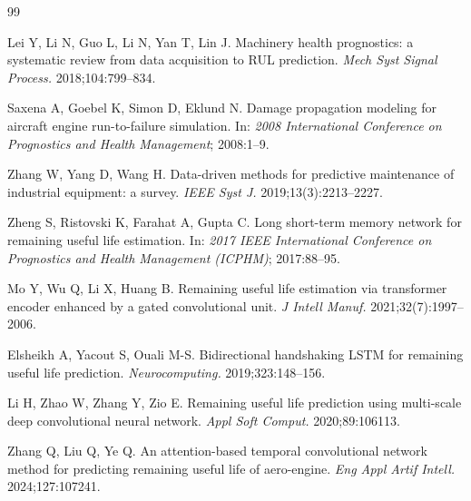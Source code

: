 \documentclass[AMA,Times1COL]{WileyNJDv5}
\begin{document}


%
%

\begin{thebibliography}{99}

Lei Y, Li N, Guo L, Li N, Yan T, Lin J.
Machinery health prognostics: a systematic review from data acquisition
to RUL prediction.
\textit{Mech Syst Signal Process.} 2018;104:799--834.

Saxena A, Goebel K, Simon D, Eklund N.
Damage propagation modeling for aircraft engine run-to-failure simulation.
In: \textit{2008 International Conference on Prognostics and Health
Management}; 2008:1--9.

Zhang W, Yang D, Wang H.
Data-driven methods for predictive maintenance of industrial equipment:
a survey.
\textit{IEEE Syst J.} 2019;13(3):2213--2227.

Zheng S, Ristovski K, Farahat A, Gupta C.
Long short-term memory network for remaining useful life estimation.
In: \textit{2017 IEEE International Conference on Prognostics and Health
Management (ICPHM)}; 2017:88--95.

Mo Y, Wu Q, Li X, Huang B.
Remaining useful life estimation via transformer encoder enhanced by
a gated convolutional unit.
\textit{J Intell Manuf.} 2021;32(7):1997--2006.

Elsheikh A, Yacout S, Ouali M-S.
Bidirectional handshaking LSTM for remaining useful life prediction.
\textit{Neurocomputing.} 2019;323:148--156.

Li H, Zhao W, Zhang Y, Zio E.
Remaining useful life prediction using multi-scale deep convolutional
neural network.
\textit{Appl Soft Comput.} 2020;89:106113.

Zhang Q, Liu Q, Ye Q.
An attention-based temporal convolutional network method for predicting
remaining useful life of aero-engine.
\textit{Eng Appl Artif Intell.} 2024;127:107241.


\end{thebibliography}
\end{document}
